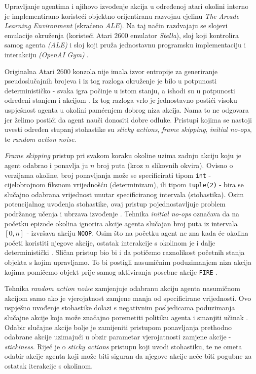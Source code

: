 Upravljanje agentima i njihovo izvođenje akcija u određenoj atari okolini interno je implementirano koristeći objektno orijentiranu razvojnu cjelinu  \textit{The Arcade Learning Environment} (skraćeno \textit{ALE}). Na taj način razdvajaju se slojevi emulacije okruženja (koristeći Atari 2600 emulator \textit{Stella}), sloj koji kontrolira samog agenta \textit{(ALE)} i sloj koji pruža jednostavnu programsku implementaciju i interakciju \textit{(OpenAI Gym)} \cite{OpenAIALE}. 

Originalna Atari 2600 konzola nije imala izvor entropije za generiranje pseudoslučajnih brojeva i iz tog razloga okruženje je bilo u potpunosti determinističko - svaka igra počinje u istom stanju, a ishodi su u potpunosti određeni stanjem i akcijom \cite{AleDeterministic}. Iz tog razloga vrlo je jednostavno postići visoku uspješnost agenta u okolini pamćenjem dobrog niza akcija. Nama to ne odgovara jer želimo postići da agent nauči donositi dobre odluke. Pristupi kojima se nastoji uvesti određen stupanj stohastike su \textit{sticky actions}, \textit{frame skipping}, \textit{initial no-ops}, te \textit{random action noise}. 

\textit{Frame skipping} pristup pri svakom koraku okoline uzima zadnju akciju koju je agent odabrao i ponavlja ju $n$ broj puta (kroz $n$ slikovnih okvira). Ovisno o verzijama okoline, broj ponavljanja može se specificirati tipom \texttt{int} - cijelobrojnom fiksnom vrijednošću (determinizam), ili tipom \texttt{tuple(2)} - bira se slučajno odabrana vrijednost unutar specificiranog intervala (stohastika). Osim potencijalnog uvođenja stohastike, ovaj pristup pojednostavljuje problem podržanog učenja i ubrzava izvođenje \cite{AleDeterministic}. Tehnika \textit{initial no-ops} označava da na početku epizode okolina ignorira akcije agenta slučajan broj puta iz intervala $[0, n]$ - izvršava akciju \texttt{NOOP}. Osim što na početku agent ne zna kada će okolina početi koristiti njegove akcije, ostatak interakcije s okolinom je i dalje deterministički \cite{AleDeterministic}. Sličan pristup bio bi i da potičemo raznolikost početnih stanja objekta s kojim upravljamo. To bi postigli nasumičnim poduzimanjem niza akcija kojima pomičemo objekt prije samog aktiviranja posebne akcije \texttt{FIRE} \cite{MediumDeterministic}.

Tehnika \textit{random action noise} zamjenjuje odabranu akciju agenta nasumičnom akcijom samo ako je vjerojatnost zamjene manja od specificirane vrijednosti. Ovo uspješno uvođenje stohastike dolazi s negativnim posljedicama poduzimanja slučajne akcije koja može značajno poremetiti politiku agenta i smanjiti učinak \cite{AleDeterministic}. Odabir slučajne akcije bolje je zamijeniti pristupom ponavljanja prethodno odabrane akcije uzimajući u obzir parametar vjerojatnosti zamjene akcije - \textit{stickiness}. Riječ je o \textit{sticky actions} pristupu koji uvodi stohastiku, te ne ometa odabir akcije agenta koji može biti siguran da njegove akcije neće biti pogubne za ostatak iterakcije s okolinom.

